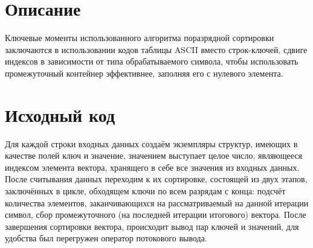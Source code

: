 \section{Описание}

Ключевые моменты использованного алгоритма поразрядной сортировки заключаются в использовании кодов таблицы ASCII вместо строк-ключей, сдвиге индексов в зависимости от типа обрабатываемого символа, чтобы использовать промежуточный контейнер эффективнее, заполняя его с нулевого элемента.

\pagebreak

\section{Исходный код}

Для каждой строки входных данных создаём экземпляры структур, имеющих в качестве полей ключ и значение, значением выступает целое число, являющееся индексом элемента вектора, хранящего в себе все значения из входных данных. После считывания данных переходим к их сортировке, состоящей из двух этапов, заключённых в цикле, обходящем ключи по всем разрядам с конца: подсчёт количества элементов, заканчивающихся на рассматриваемый на данной итерации символ, сбор промежуточного (на последней итерации итогового) вектора. После завершения сортировки вектора, происходит вывод пар ключей и значений, для удобства был перегружен оператор потокового вывода. 

